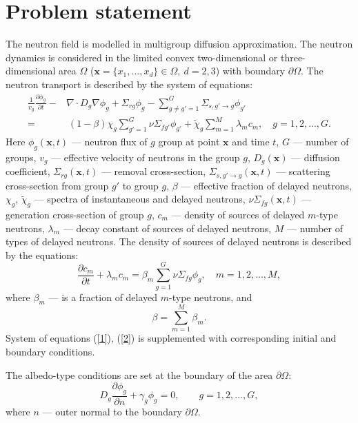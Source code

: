 \documentclass[authoryear]{elsarticle}
\begin{document}
\section{Problem statement}

The neutron field is modelled in multigroup diffusion approximation. The neutron dynamics is considered in the limited convex two-dimensional or three-dimensional area  $\Omega$ ($\bm x = \{x_1, ..., x_d\} \in \Omega, \ d = 2,3$) with boundary $\partial \Omega$. The neutron transport is described by the system of equations:
\begin{equation}\label{1}
\begin{split}
 \frac{1}{v_g} \frac{\partial \phi_g}{\partial t} - & \nabla \cdot D_g \nabla \phi_g + \Sigma_{rg} \phi_g 
 - \sum_{g\neq g'=1}^{G} \Sigma_{s,g'\rightarrow g} \phi_{g'} \\
 =  & \ (1-\beta) \chi_g \sum_{g'=1}^{G} \nu \Sigma_{fg'} \phi_{g'} + \widetilde{\chi}_g \sum_{m=1}^{M} \lambda_m c_m , \quad 
 g = 1,2, ..., G .
\end{split}
\end{equation} 
Here $\phi_g(\bm x,t)$ --- neutron flux of $g$ group at point $\bm x$ and time $t$,
$G$ --- number of groups,
$v_g$ --- effective velocity of neutrons in the group $g$,
$D_g(\bm x)$ --- diffusion coefficient, $\Sigma_{rg}(\bm x,t)$ --- removal cross-section,
$\Sigma_{s,g'\rightarrow g}(\bm x,t)$ --- scattering cross-section from group $g'$ to group $g$,
$\beta$ --- effective fraction of delayed neutrons, $\chi_g$, $\widetilde{\chi}_g$  --- spectra of instantaneous and delayed neutrons, 
$\nu\Sigma_{fg}(\bm x,t)$ --- generation cross-section of group $g$,
$c_m$ --- density of sources of delayed  $m$-type neutrons,  $\lambda_m$ --- decay constant of sources of delayed neutrons,
$M$ --- number of types of delayed neutrons.
The density of sources of delayed neutrons is described by the equations:
\begin{equation}\label{2}
 \frac{\partial c_m}{\partial t} + \lambda_m c_m = \beta_m \sum_{g=1}^{G} \nu \Sigma_{fg} \phi_g ,
 \quad m = 1,2, ..., M , 
\end{equation} 
where $\beta_m$ --- is a fraction of delayed $m$-type neutrons, and
\[
 \beta = \sum_{m=1}^{M} \beta_m .
\] 
System of equations (\ref{1}), (\ref{2}) is supplemented with corresponding initial and boundary conditions.

The albedo-type conditions are set at the boundary of the area $\partial \Omega$:
\begin{equation}\label{3}
 D_g\frac{\partial \phi_g}{\partial n} + \gamma_g \phi_g = 0, \quad 
 \quad g = 1,2, ..., G ,
\end{equation}
where $n$ --- outer normal to the boundary $\partial \Omega$.
\end{document}
